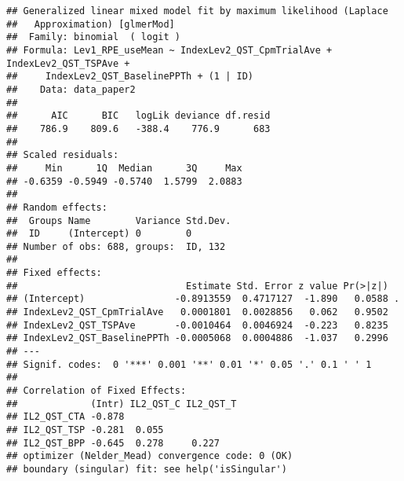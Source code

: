 \documentclass[
  12pt,
]{article}
\begin{document}
\begin{verbatim}
## Generalized linear mixed model fit by maximum likelihood (Laplace
##   Approximation) [glmerMod]
##  Family: binomial  ( logit )
## Formula: Lev1_RPE_useMean ~ IndexLev2_QST_CpmTrialAve + IndexLev2_QST_TSPAve +  
##     IndexLev2_QST_BaselinePPTh + (1 | ID)
##    Data: data_paper2
## 
##      AIC      BIC   logLik deviance df.resid 
##    786.9    809.6   -388.4    776.9      683 
## 
## Scaled residuals: 
##     Min      1Q  Median      3Q     Max 
## -0.6359 -0.5949 -0.5740  1.5799  2.0883 
## 
## Random effects:
##  Groups Name        Variance Std.Dev.
##  ID     (Intercept) 0        0       
## Number of obs: 688, groups:  ID, 132
## 
## Fixed effects:
##                              Estimate Std. Error z value Pr(>|z|)  
## (Intercept)                -0.8913559  0.4717127  -1.890   0.0588 .
## IndexLev2_QST_CpmTrialAve   0.0001801  0.0028856   0.062   0.9502  
## IndexLev2_QST_TSPAve       -0.0010464  0.0046924  -0.223   0.8235  
## IndexLev2_QST_BaselinePPTh -0.0005068  0.0004886  -1.037   0.2996  
## ---
## Signif. codes:  0 '***' 0.001 '**' 0.01 '*' 0.05 '.' 0.1 ' ' 1
## 
## Correlation of Fixed Effects:
##             (Intr) IL2_QST_C IL2_QST_T
## IL2_QST_CTA -0.878                    
## IL2_QST_TSP -0.281  0.055             
## IL2_QST_BPP -0.645  0.278     0.227   
## optimizer (Nelder_Mead) convergence code: 0 (OK)
## boundary (singular) fit: see help('isSingular')
\end{verbatim}
\end{document}
